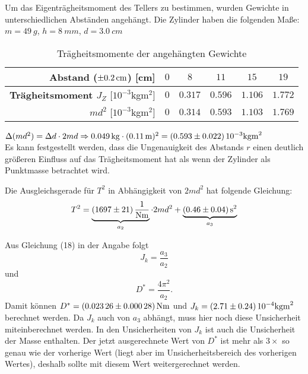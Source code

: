 \documentclass[a4paper,11pt]{article}
\begin{document}
Um das Eigenträgheitsmoment des Tellers zu bestimmen, wurden Gewichte in unterschiedlichen Abständen angehängt.
Die Zylinder haben die folgenden Maße: $m = \SI{49}{g}$, $h = \SI{8}{mm}$, $d = \SI{3.0}{cm}$
\begin{table}[h]
\begin{center}\label{tab:Gewichte}
\begin{tabular}{r|ccccc}\hline
\textbf{Abstand} ($\SI{\pm 0.2}{cm}$) [cm] & $0$ & $8$ & $11$ & $15$ & $19$ \\
\hline
\textbf{Trägheitsmoment $J_Z$} [$10^{-3}$kgm$^2$] & $0$ & $0.317$ & $0.596$ & $1.106$ & $1.772$ \\
\textbf{$md^2$} [$10^{-3}$kgm$^2$]                & $0$ & $0.314$ & $0.593$ & $1.103$ & $1.769$ \\
\hline\end{tabular}
\caption{Trägheitsmomente der angehängten Gewichte}
\end{center}
\end{table}

$\Delta (md^2) = \Delta d \cdot 2md \Rightarrow \SI{0.049}{kg} \cdot (\SI{0.11}{m})^2 = \SI{0.593 \pm 0.022}{10^{-3} kgm^2}$\\
Es kann festgestellt werden, dass die Ungenauigkeit des Abstands $r$ einen deutlich größeren Einfluss auf das Trägheitsmoment hat als wenn der Zylinder als Punktmasse betrachtet wird.

Die Ausgleichsgerade für $T^2$ in Abhängigkeit von $2md^2$ hat folgende Gleichung:
\begin{equation}
T^2 = \underbrace{\SI{1697 \pm 21}{1 \over Nm}}_{a_2} \cdot 2md^2 + \underbrace{\SI{0.46 \pm 0.04}{s^2}}_{a_3}
\end{equation}

Aus Gleichung (18) in der Angabe folgt
\begin{equation}
J_k = \frac{a_3}{a_2}
\end{equation}
und
\begin{equation}
D^* = \frac{4\pi^2}{a_2}.
\end{equation}
Damit können $D^* = \SI{0.02326 \pm 0.00028}{Nm}$ und $J_k = \SI{2.71 \pm 0.24}{10^{-4}kgm^2}$ berechnet werden. Da $J_k$ auch von $a_3$ abhängt, muss hier noch diese Unsicherheit miteinberechnet werden. In den Unsicherheiten von $J_k$ ist auch die Unsicherheit der Masse enthalten. Der jetzt ausgerechnete Wert von $D^*$ ist mehr als $3\times$ so genau wie der vorherige Wert (liegt aber im Unsicherheitsbereich des vorherigen Wertes), deshalb sollte mit diesem Wert weitergerechnet werden.
\end{document}
